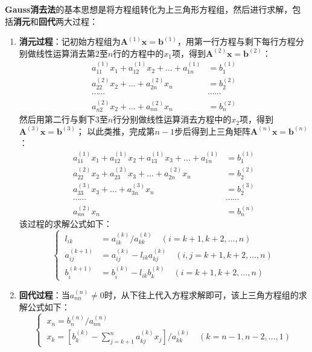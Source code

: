 \textbf{Gauss消去法}的基本思想是将方程组转化为上三角形方程组，然后进行求解，包括\textbf{消元}和\textbf{回代}两大过程：
\begin{enumerate}
    \item \textbf{消元过程}：记初始方程组为$\boldsymbol{A}^{(1)}\boldsymbol{x} = \boldsymbol{b}^{(1)}$，用第一行方程与剩下每行方程分别做线性运算消去第$2$至$n$行的方程中的$x_1$项，得到$\boldsymbol{A}^{(2)}\boldsymbol{x}=\boldsymbol{b}^{(2)}$：
    \begin{align*}
        a_{11}^{(1)}x_1 + a_{12}^{(1)}x_2 + \dots + a_{1n}^{(1)} &= b_1^{(1)} \\
        a_{22}^{(2)}x_2 + \dots + a_{2n}^{(2)}x_n &= b_2^{(2)} \\
        \cdots \cdots & \cdots \cdots \\
        a_{n2}^{(2)}x_2 + \dots + a_{nn}^{(2)}x_n &= b_n^{(2)}
    \end{align*}
    然后用第二行与剩下$3$至$n$行分别做线性运算消去方程中的$x_2$项，得到$\boldsymbol{A}^{(3)}\boldsymbol{x}=\boldsymbol{b}^{(3)}$；
    以此类推，完成第$n-1$步后得到上三角矩阵$\boldsymbol{A}^{(n)}\boldsymbol{x}=\boldsymbol{b}^{(n)}$：
    \begin{align*}
        a_{11}^{(1)}x_1 + a_{12}^{(1)}x_2 + a_{13}^{(1)}x_3 + \dots + a_{1n}^{(1)} &= b_1^{(1)} \\
        a_{22}^{(2)}x_2 + a_{23}^{(2)}x_3 + \dots + a_{2n}^{(2)}x_n &= b_2^{(2)} \\
        a_{33}^{(3)}x_3 + \dots + a_{3n}^{(3)}x_n &= b_2^{(3)} \\
        \cdots \cdots & \cdots \cdots \\
        a_{nn}^{(2)}x_n &= b_n^{(n)}
    \end{align*}
    该过程的求解公式如下：
    \begin{equation}
        \begin{cases}
            \ l_{ik} &= a_{ik}^{(k)} / a_{kk}^{(k)} \quad (i=k+1,k+2,\dots,n) \\[3mm]
            \ a_{ij}^{(k+1)} &= a_{ij}^{(k)} - l_{ik}a_{kj}^{(k)} \quad (i,j = k+1,k+2,\dots,n) \\[3mm]
            \ b_i^{(k+1)} &= b_i^{(k)} - l_{ik}b_k^{(k)} \quad (i=k+1,k+2,\dots,n)
        \end{cases}
    \end{equation}

    \item \textbf{回代过程}：当$a_{nn}^{(n)}\neq 0$时，从下往上代入方程求解即可，该上三角方程组的求解公式如下：
    \begin{equation}
        \begin{cases}
            \ x_n = b_n^{(n)} / a_{nn}^{(n)} \\[3mm]
            \ x_k = [b_k^{(k)} - \sum\limits_{j=k+1}^{n} a_{kj}^{(k)} x_j] / a_{kk}^{(k)} \quad (k=n-1,n-2,\dots,1)
        \end{cases}
    \end{equation}
\end{enumerate}

